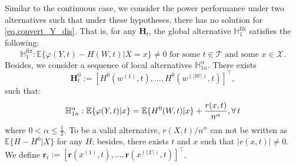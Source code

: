 \documentclass[
  12pt]{article}
\def\H{\mathbf{H}}
\def\r{\mathbf{r}}
\def\mE{\mathbb{E}}
\def\mH{\mathbb{H}}
\def\cT{\mathcal{T}}
\def\mE{\mathbb{E}}
\begin{document}
Similar to the continuous case, we consider the power performance under two alternatives such that under these hypotheses, there has no solution for \eqref{eq.convert_Y_dis}. That is, for any $\H_t$, the global alternative $\mH_1^{\mathrm{fix}}$ satisfies the following:
\begin{equation*}
    \mH_1^{\mathrm{fix}}: \mathbb{E}\{\varphi(Y,t)-H(W,t)|X=x\} \neq 0 \text{ for some $t \in \cT$ and some $x\in \mathcal{X}$}. 
\end{equation*}
Besides, we consider a sequence of local alternatives $\mH^\alpha_{1n}$. There exists $$\H^0_t := [H^0(w^{(1)}, t),..., H^0(w^{(|\mathcal{W}|)}, t)]^\top,
$$
such that: 
\begin{equation*}
    \mathbb H^\alpha_{1n}: \mathbb{E}\{\varphi(Y,t)|x\}= \mathbb{E}\{H^0(W,t)|x\}+\frac{r(x,t)}{n^\alpha}, \forall \thinspace t
\end{equation*}
where $0 < \alpha \leq \frac{1}{2}$. To be a valid alternative, $r(X,t)/n^\alpha$ can not be written as $\mE\{H - H^0|X\}$ for any $H$; besides, there exists $t$ and $x$ such that $|r(x,t)| \neq 0$. We define $\r_t := [\r(x^{(1)},t), ..., \r(x^{(|\mathcal{X}|)},t)]^\top$. 
\end{document}
